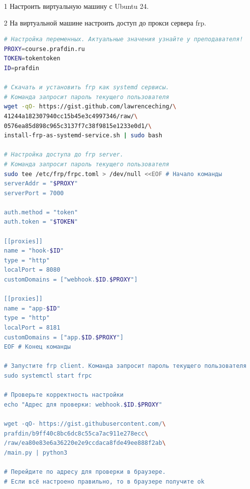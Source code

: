 \documentclass[12pt,a4paper]{article}
\begin{document}
\begin{task}{1}
    Настроить виртуальную машину с Ubuntu 24.
\end{task}

\begin{task}{2}
    На виртуальной машине настроить доступ до прокси сервера frp.

    \begin{lstlisting}[language=bash, numbers=none, frame=single, basicstyle=\ttfamily\footnotesize, columns=fullflexible, keepspaces=true, breaklines=false, commentstyle=\color{gray}\itshape, extendedchars=true, texcl=true, showstringspaces=false]
# Настройка переменных. Актуальные значения узнайте у преподавателя!
PROXY=course.prafdin.ru
TOKEN=tokentoken
ID=prafdin

# Скачать и установить frp как systemd сервисы.
# Команда запросит пароль текущего пользователя
wget -qO- https://gist.github.com/lawrenceching/\
41244a182307940cc15b45e3c4997346/raw/\
0576ea85d898c965c3137f7c38f9815e1233e0d1/\
install-frp-as-systemd-service.sh | sudo bash

# Настройка доступа до frp server.
# Команда запросит пароль текущего пользователя
sudo tee /etc/frp/frpc.toml > /dev/null <<EOF # Начало команды
serverAddr = "$PROXY"
serverPort = 7000

auth.method = "token"
auth.token = "$TOKEN"

[[proxies]]
name = "hook-$ID"
type = "http"
localPort = 8080
customDomains = ["webhook.$ID.$PROXY"]

[[proxies]]
name = "app-$ID"
type = "http"
localPort = 8181
customDomains = ["app.$ID.$PROXY"]
EOF # Конец команды

# Запустите frp client. Команда запросит пароль текущего пользователя
sudo systemctl start frpc

# Проверьте корректность настройки
echo "Адрес для проверки: webhook.$ID.$PROXY"

wget -qO- https://gist.githubusercontent.com/\
prafdin/b9ff40c8bc6dc8c55ca7ac911e278ecc\
/raw/ea80e83e6a36220e2e9ccdaca8fde49ee888f2ab\
/main.py | python3

# Перейдите по адресу для проверки в браузере.
# Если всё настроено правильно, то в браузере получите ok
\end{lstlisting}

\end{task}
\end{document}
